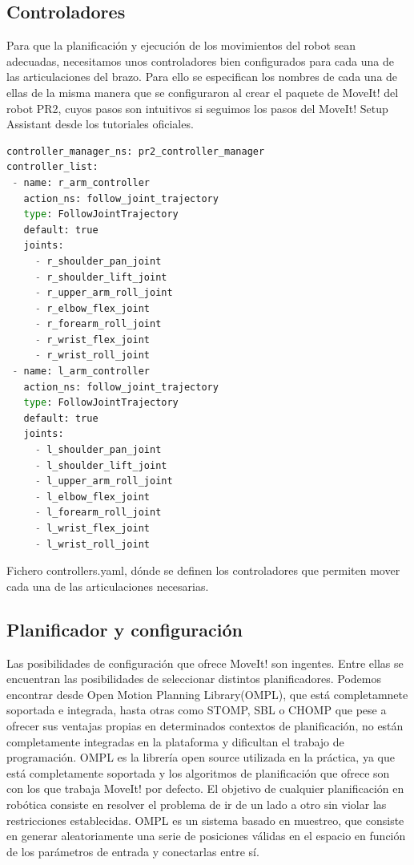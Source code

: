 \documentclass[12pt,spanish,chapterprefix, numbers=noenddot]{book}
\numberwithin{equation}{section}
\numberwithin{figure}{section}
\begin{document}
\subsection{Controladores}
Para que la planificación y ejecución de los movimientos del robot sean adecuadas, necesitamos unos controladores bien configurados para cada una de las articulaciones del brazo. \cite{pr2_controllers}
Para ello se especifican los nombres de cada una de ellas de la misma manera que se configuraron al crear el paquete de MoveIt! del robot PR2, cuyos pasos son intuitivos si seguimos los pasos del MoveIt! Setup Assistant desde los tutoriales oficiales. \cite{moveit_tutorials}
\vspace{20pt}
\begin{algorithm}[htb!]
	\begin{lstlisting}[breaklines=true,language=python] 
controller_manager_ns: pr2_controller_manager
controller_list:
 - name: r_arm_controller
   action_ns: follow_joint_trajectory
   type: FollowJointTrajectory
   default: true
   joints:
     - r_shoulder_pan_joint
     - r_shoulder_lift_joint
     - r_upper_arm_roll_joint
     - r_elbow_flex_joint
     - r_forearm_roll_joint
     - r_wrist_flex_joint
     - r_wrist_roll_joint
 - name: l_arm_controller
   action_ns: follow_joint_trajectory
   type: FollowJointTrajectory
   default: true
   joints:
     - l_shoulder_pan_joint
     - l_shoulder_lift_joint
     - l_upper_arm_roll_joint
     - l_elbow_flex_joint
     - l_forearm_roll_joint
     - l_wrist_flex_joint
     - l_wrist_roll_joint
	\end{lstlisting}
\caption{\label{alg:pr2_controllers}Fichero controllers.yaml, dónde se definen los controladores que permiten mover cada una de las articulaciones necesarias.}
\end{algorithm}
\subsection{Planificador y configuración}
Las posibilidades de configuración que ofrece MoveIt! son ingentes. Entre ellas se encuentran las posibilidades de seleccionar distintos planificadores. Podemos encontrar desde Open Motion Planning Library(OMPL), que está completamnete soportada e integrada, hasta otras como STOMP, SBL o CHOMP que pese a ofrecer sus ventajas propias en determinados contextos de planificación, no están completamente integradas en la plataforma y dificultan el trabajo de programación. 
OMPL es la librería open source utilizada en la práctica, ya que está completamente soportada y los algoritmos de planificación que ofrece son con los que trabaja MoveIt! por defecto. \cite{moveit_planners}
El objetivo de cualquier planificación en robótica consiste en resolver el problema de ir de un lado a otro sin violar las restricciones establecidas. OMPL es un sistema basado en muestreo, que consiste en generar aleatoriamente una serie de posiciones válidas en el espacio en función de los parámetros de entrada y conectarlas entre sí.
\end{document}

